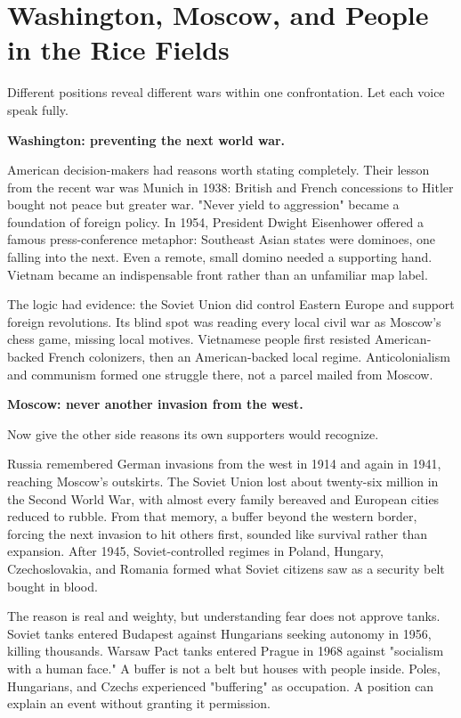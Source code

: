 \section[Superpowers and People in Rice Fields]{Washington, Moscow, and People in the Rice Fields}
Different positions reveal different wars within one confrontation. Let each voice speak fully.

\textbf{Washington: preventing the next world war.}

American decision-makers had reasons worth stating completely. Their lesson from the recent war was Munich in 1938: British and French concessions to Hitler bought not peace but greater war. "Never yield to aggression" became a foundation of foreign policy. In 1954, President Dwight Eisenhower offered a famous press-conference metaphor: Southeast Asian states were dominoes, one falling into the next. Even a remote, small domino needed a supporting hand. Vietnam became an indispensable front rather than an unfamiliar map label.

The logic had evidence: the Soviet Union did control Eastern Europe and support foreign revolutions. Its blind spot was reading every local civil war as Moscow's chess game, missing local motives. Vietnamese people first resisted American-backed French colonizers, then an American-backed local regime. Anticolonialism and communism formed one struggle there, not a parcel mailed from Moscow.

\textbf{Moscow: never another invasion from the west.}

Now give the other side reasons its own supporters would recognize.

Russia remembered German invasions from the west in 1914 and again in 1941, reaching Moscow's outskirts. The Soviet Union lost about twenty-six million in the Second World War, with almost every family bereaved and European cities reduced to rubble. From that memory, a buffer beyond the western border, forcing the next invasion to hit others first, sounded like survival rather than expansion. After 1945, Soviet-controlled regimes in Poland, Hungary, Czechoslovakia, and Romania formed what Soviet citizens saw as a security belt bought in blood.

The reason is real and weighty, but understanding fear does not approve tanks. Soviet tanks entered Budapest against Hungarians seeking autonomy in 1956, killing thousands. Warsaw Pact tanks entered Prague in 1968 against "socialism with a human face." A buffer is not a belt but houses with people inside. Poles, Hungarians, and Czechs experienced "buffering" as occupation. A position can explain an event without granting it permission.

